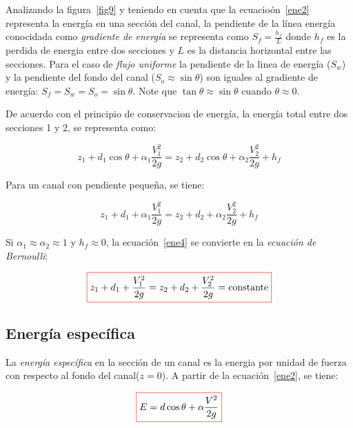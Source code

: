 \documentclass[11pt, oneside]{article}
\begin{document}
Analizando la figura~\ref{fig9} y teniendo en cuenta que la ecuacio\'on~\ref{ene2} representa la energ\'ia en una secci\'on del canal, la pendiente de la l\'inea energ\'ia conocidada como \emph{gradiente de energ\'ia} se representa como $S_f=\frac{h_f}{L}$ donde $h_f$ es la perdida de energia entre dos secciones y $L$ es la distancia horizontal entre las secciones. Para el caso de \emph{flujo uniforme} la pendiente de la linea de energ\'ia ($S_w$) y la pendiente del fondo del canal ($S_o \approx \sin \theta$) son iguales al gradiente de energ\'ia: $S_f = S_w = S_o = \sin \theta$. Note que $\tan \theta \approx \sin \theta$ cuando $\theta \approx 0$. 

De acuerdo con el principio de conservacion de energ\'ia, la energ\'ia total entre dos secciones 1 y 2, se representa como:

\begin{equation}
z_1 + d_1 \cos \theta + \alpha_1 \frac{V_1^2}{2g} = z_2 + d_2 \cos \theta + \alpha_2 \frac{V_2^2}{2g} + h_{f}
\label{ene3}
\end{equation}

Para un canal con pendiente peque\~na, se tiene:

\begin{equation}
 z_1 + d_1 + \alpha_1 \frac{V_1^2}{2g} = z_2 + d_2 + \alpha_2 \frac{V_2^2}{2g} + h_{f}
\label{ene4}
\end{equation}

Si $\alpha_1 \approx \alpha_2 \approx 1$ y $h_f \approx 0$, la ecuaci\'on~\ref{ene4} se convierte en la \emph{ecuaci\'on de Bernoulli}:

\begin{equation}
\color{red}\boxed{\color{black} z_1 + d_1 + \frac{V_1^2}{2g} = z_2 + d_2 + \frac{V_2^2}{2g} = \text{constante}}
\label{ene5}
\end{equation}

\subsection{Energ\'ia espec\'ifica}
La \emph{energ\'ia espec\'ifica} en la secci\'on de un canal es la energia por unidad de fuerza con respecto al fondo del canal($z=0$). A partir de la ecuaci\'on~\ref{ene2}, se tiene:

\begin{equation}
\color{red}\boxed{\color{black} E =   d\cos \theta + \alpha\frac{V^2}{2g}}
\label{ene6}
\end{equation}
\end{document}
